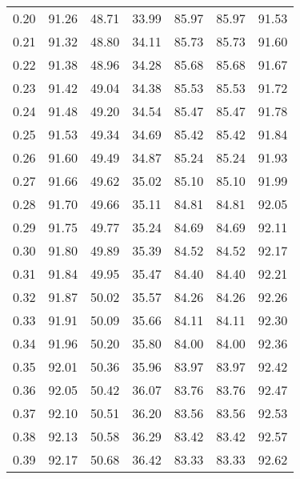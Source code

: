 \begin{tabular}{|c|c|c|c|c|c|c|}
      0.20 &     91.26 &     48.71 &      33.99 &   85.97 &      85.97 &         91.53 \\
      0.21 &     91.32 &     48.80 &      34.11 &   85.73 &      85.73 &         91.60 \\
      0.22 &     91.38 &     48.96 &      34.28 &   85.68 &      85.68 &         91.67 \\
      0.23 &     91.42 &     49.04 &      34.38 &   85.53 &      85.53 &         91.72 \\
      0.24 &     91.48 &     49.20 &      34.54 &   85.47 &      85.47 &         91.78 \\
      0.25 &     91.53 &     49.34 &      34.69 &   85.42 &      85.42 &         91.84 \\
      0.26 &     91.60 &     49.49 &      34.87 &   85.24 &      85.24 &         91.93 \\
      0.27 &     91.66 &     49.62 &      35.02 &   85.10 &      85.10 &         91.99 \\
      0.28 &     91.70 &     49.66 &      35.11 &   84.81 &      84.81 &         92.05 \\
      0.29 &     91.75 &     49.77 &      35.24 &   84.69 &      84.69 &         92.11 \\
      0.30 &     91.80 &     49.89 &      35.39 &   84.52 &      84.52 &         92.17 \\
      0.31 &     91.84 &     49.95 &      35.47 &   84.40 &      84.40 &         92.21 \\
      0.32 &     91.87 &     50.02 &      35.57 &   84.26 &      84.26 &         92.26 \\
      0.33 &     91.91 &     50.09 &      35.66 &   84.11 &      84.11 &         92.30 \\
      0.34 &     91.96 &     50.20 &      35.80 &   84.00 &      84.00 &         92.36 \\
      0.35 &     92.01 &     50.36 &      35.96 &   83.97 &      83.97 &         92.42 \\
      0.36 &     92.05 &     50.42 &      36.07 &   83.76 &      83.76 &         92.47 \\
      0.37 &     92.10 &     50.51 &      36.20 &   83.56 &      83.56 &         92.53 \\
      0.38 &     92.13 &     50.58 &      36.29 &   83.42 &      83.42 &         92.57 \\
      0.39 &     92.17 &     50.68 &      36.42 &   83.33 &      83.33 &         92.62 \\

\end{tabular}
